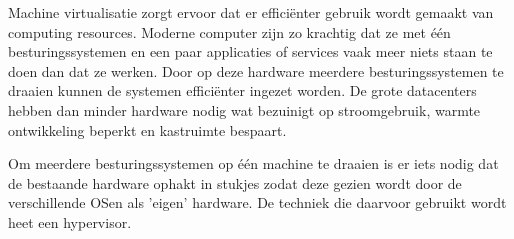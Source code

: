 Machine virtualisatie zorgt ervoor dat er effici\"enter gebruik wordt gemaakt van computing resources. Moderne computer zijn zo krachtig dat ze met \'e\'en besturingssystemen en een paar applicaties of services vaak meer niets staan te doen dan dat ze werken. Door op deze hardware meerdere besturingssystemen te draaien kunnen de systemen effici\"enter ingezet worden. De grote datacenters hebben dan minder hardware nodig wat bezuinigt op stroomgebruik, warmte ontwikkeling beperkt en kastruimte bespaart.

Om meerdere besturingssystemen op \'e\'en machine te draaien is er iets nodig dat de bestaande hardware ophakt in stukjes zodat deze gezien wordt door de verschillende OSen als 'eigen' hardware. De techniek die daarvoor gebruikt wordt heet een hypervisor.
